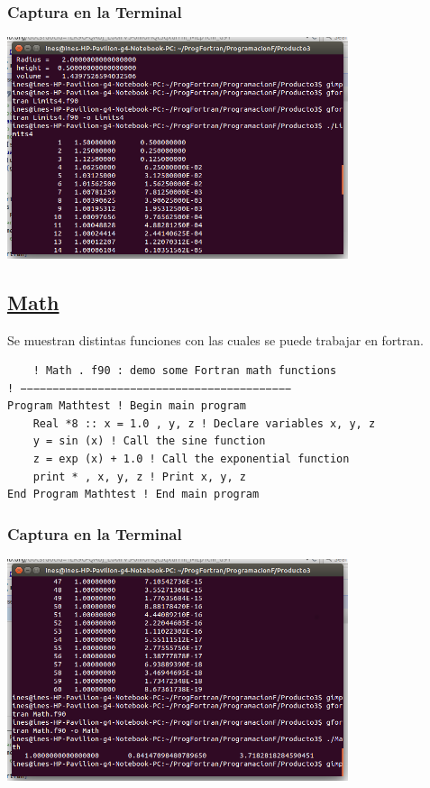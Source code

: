 \documentclass[a4paper]{article}
\begin{document}
 \subsubsection{Captura en la Terminal}
 \begin{center}
\includegraphics[width=10cm]{Limits4.png}
\end{center}
  
  \subsection{\underline{Math}}
  Se muestran distintas funciones con las cuales se puede trabajar en fortran.








  
    \begin{verbatim}
    ! Math . f90 : demo some Fortran math functions
! −−−−−−−−−−−−−−−−−−−−−−−−−−−−−−−−−−−−−−−−−−
Program Mathtest ! Begin main program
    Real *8 :: x = 1.0 , y, z ! Declare variables x, y, z
    y = sin (x) ! Call the sine function
    z = exp (x) + 1.0 ! Call the exponential function
    print * , x, y, z ! Print x, y, z
End Program Mathtest ! End main program
\end{verbatim}
    
\subsubsection{Captura en la Terminal}
 \begin{center}
\includegraphics[width=10cm]{Math.png}
\end{center}
    
\end{document}
